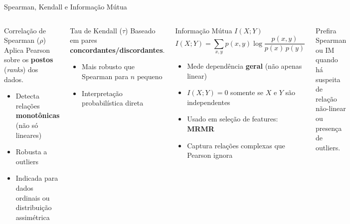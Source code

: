 \documentclass[aspectratio=169]{beamer}
\begin{document}
\begin{frame}[shrink=5]{Spearman, Kendall e Informação Mútua}
    \begin{columns}
        \begin{block}{Correlação de Spearman ($\rho$)}
            \footnotesize
            Aplica Pearson sobre os \textbf{postos} (\textit{ranks}) dos dados.
            \begin{itemize}\footnotesize
                \item Detecta relações \textbf{monotônicas} (não só lineares)
                \item Robusta a outliers
                \item Indicada para dados ordinais ou distribuição assimétrica
            \end{itemize}
        \end{block}
        \pause
        \begin{block}{Tau de Kendall ($\tau$)}
            \footnotesize
            Baseado em pares \textbf{concordantes/discordantes}.
            \begin{itemize}\footnotesize
                \item Mais robusto que Spearman para $n$ pequeno
                \item Interpretação probabilística direta
            \end{itemize}
        \end{block}
        \pause
        \begin{block}{Informação Mútua $I(X;Y)$}
            \[
              I(X;Y) = \sum_{x,y} p(x,y)\log\frac{p(x,y)}{p(x)\,p(y)}
            \]
            \begin{itemize}\footnotesize
                \item Mede dependência \textbf{geral} (não apenas linear)
                \item $I(X;Y) = 0$ somente se $X$ e $Y$ são independentes
                \item Usado em seleção de features: \textbf{MRMR}
                \item Captura relações complexas que Pearson ignora
            \end{itemize}
        \end{block}
        \pause
        \begin{alertblock}{}
            \footnotesize Prefira Spearman ou IM quando há suspeita de relação não-linear ou presença de outliers.
        \end{alertblock}
    \end{columns}
\end{frame}
\end{document}
